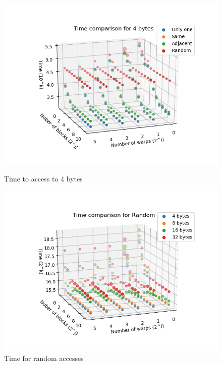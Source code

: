 \begin{figure}[!ht]
  \begin{minipage}[b]{0.5\linewidth}
    \centering
    \includegraphics[width=\linewidth]{Chapters/Accesses/4bytesaccesses.png} 
    \caption{Time to access to 4 bytes} 
    \vspace{4ex}
  \end{minipage}%
  \begin{minipage}[b]{0.5\linewidth}
    \centering
    \includegraphics[width=\linewidth]{Chapters/Accesses/Random.png} 
    \caption{Time for random accesses} 
    \vspace{4ex}
  \end{minipage} 
\end{figure}

